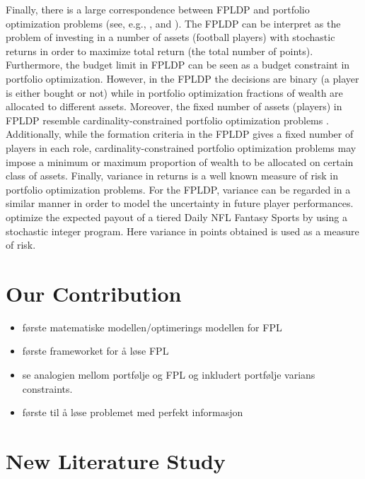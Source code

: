 \newpar

Finally, there is a large correspondence between FPLDP and portfolio optimization problems (see, e.g., \cite{Markowitz}, \cite{Zenios} and \cite{Speranza}). The FPLDP can be interpret as the problem of investing in a number of assets (football players) with stochastic returns in order to maximize total return (the total number of points). Furthermore, the budget limit in FPLDP can be seen as a budget constraint in portfolio optimization. However, in the FPLDP the decisions are binary (a player is either bought or not) while in portfolio optimization fractions of wealth are allocated to different assets. Moreover, the fixed number of assets (players) in FPLDP resemble cardinality-constrained portfolio optimization problems \citep{Chang}. Additionally, while the formation criteria in the FPLDP gives a fixed number of players in each role, cardinality-constrained portfolio optimization problems may impose a minimum or maximum proportion of wealth to be allocated on certain class of assets. Finally, variance in returns is a well known measure of risk in portfolio optimization problems. For the FPLDP, variance can be regarded in a similar manner in order to model the uncertainty in future player performances. \cite{Dailyfantasysports} optimize the expected payout of a tiered Daily NFL Fantasy Sports by using a stochastic integer program. Here variance in points obtained is used as a measure of risk.



\section{Our Contribution}

\begin{itemize}
    \item første matematiske modellen/optimerings modellen for FPL 
    \item første frameworket for å løse FPL 
    \item se analogien mellom portfølje og FPL og inkludert portfølje varians constraints.
    \item første til å løse problemet med perfekt informasjon 
\end{itemize}




\iffalse %


\section{New Literature Study} \label{new} 

